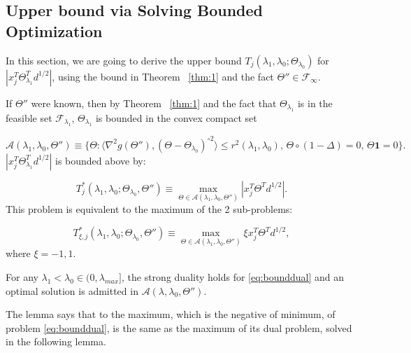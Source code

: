 \subsection{Upper bound via Solving Bounded Optimization}

In this section, we are going to derive the upper bound $T_j(\lambda_1,\lambda_0;\Theta_{\lambda_0})$ for $|x_j^T\Theta^T_{\lambda_1}d^{1/2}|$, using the bound in Theorem ~\ref{thm:1} and the fact $\Theta''\in\mathcal{F}_{\infty}$.

If $\Theta''$ were known, then by Theorem ~\ref{thm:1} and the fact that $\Theta_{\lambda_1}$ is in the feasible set $\mathcal{F}_{\lambda_1}$, $\Theta_{\lambda_1}$ is bounded in the convex compact set

 \begin{equation}
     \mathcal{A}(\lambda_1,{\lambda_0},\Theta'')\equiv\{\Theta:\langle\nabla^2 g(\Theta''),(\Theta-\Theta_{\lambda_0})^{\circ 2}\rangle\leq r^2(\lambda_1,\lambda_0),\,\Theta\circ(1-\Delta)=0,\, \Theta\mathbf{1}=0\}.
 \end{equation}
$|x_j^T\Theta^T_{\lambda_1}d^{1/2}|$ is bounded above by:

\begin{equation}
    T^*_{j}(\lambda_1,\lambda_0;\Theta_{\lambda_0},\Theta'')\equiv\max_{\Theta\in\mathcal{A}(\lambda_1,{\lambda_0},\Theta'')} |x_j^T\Theta^T d^{1/2}|.
\end{equation}
This problem is equivalent to the maximum of the 2 sub-problems:

\begin{equation}
    \label{eq:bounddual}
    T^*_{\xi,j}(\lambda_1,\lambda_0;\Theta_{\lambda_0},\Theta'')\equiv\max_{\Theta\in\mathcal{A}(\lambda_1,{\lambda_0},\Theta'')} \xi x_j^T\Theta^T d^{1/2},
\end{equation}
where $\xi=-1,1$.

\begin{lemma}
    \label{lem:2}
    For any $\lambda_1<\lambda_{0}\in (0,\lambda_{max}]$, the strong duality holds for \eqref{eq:bounddual} and an optimal solution is admitted in $\mathcal{A}(\lambda,{\lambda_0},\Theta'')$.
\end{lemma}

The lemma says that to the maximum, which is the negative of minimum, of problem \eqref{eq:bounddual}, is the same as the maximum of its dual problem, solved in the following lemma.

